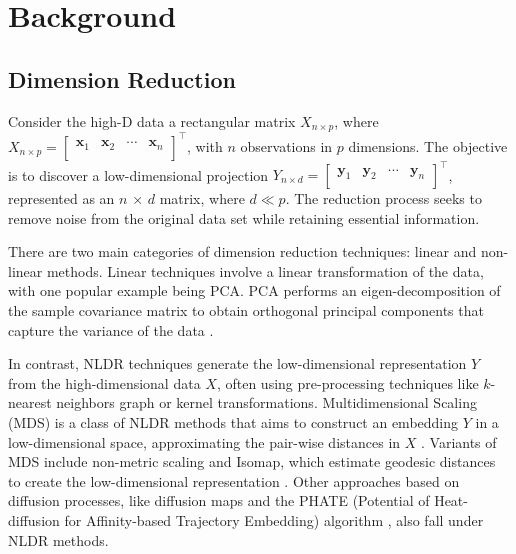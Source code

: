 \documentclass[
  12pt]{article}
\begin{document}
\section{Background}\label{sec-background}

\subsection{Dimension Reduction}\label{dimension-reduction}

Consider the high-D data a rectangular matrix \(X_{n \times p}\), where
\(X_{n \times p} = \begin{bmatrix} \textbf{x}_{1} & \textbf{x}_{2} & \cdots & \textbf{x}_{n}\\ \end{bmatrix}^\top\),
with \(n\) observations in \(p\) dimensions. The objective is to
discover a low-dimensional projection
\(Y_{n \times d} = \begin{bmatrix} \textbf{y}_{1} & \textbf{y}_{2} & \cdots & \textbf{y}_{n}\\ \end{bmatrix}^\top\),
represented as an \(n\) × \(d\) matrix, where \(d \ll p\). The reduction
process seeks to remove noise from the original data set while retaining
essential information.

There are two main categories of dimension reduction techniques: linear
and non-linear methods. Linear techniques involve a linear
transformation of the data, with one popular example being PCA. PCA
performs an eigen-decomposition of the sample covariance matrix to
obtain orthogonal principal components that capture the variance of the
data \citep{Karl1901}.

In contrast, NLDR techniques generate the low-dimensional representation
\(Y\) from the high-dimensional data \(X\), often using pre-processing
techniques like \(k\)-nearest neighbors graph or kernel transformations.
Multidimensional Scaling (MDS) is a class of NLDR methods that aims to
construct an embedding \(Y\) in a low-dimensional space, approximating
the pair-wise distances in \(X\) \citep{Torgerson1967}. Variants of MDS
include non-metric scaling \citep{article62} and Isomap, which estimate
geodesic distances to create the low-dimensional representation
\citep{article63}. Other approaches based on diffusion processes, like
diffusion maps \citep{article64} and the PHATE (Potential of
Heat-diffusion for Affinity-based Trajectory Embedding) algorithm
\citep{article03}, also fall under NLDR methods.
\end{document}
